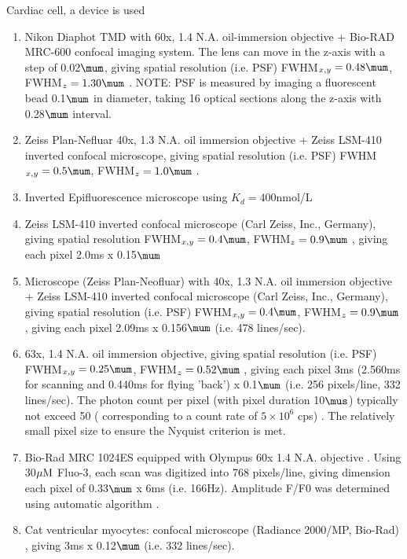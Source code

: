 Cardiac cell, a device is used
\begin{enumerate}
  \item Nikon Diaphot TMD with 60x, 1.4 N.A. oil-immersion objective + Bio-RAD
  MRC-600 confocal imaging system. The lens can move in the z-axis with a step
  of 0.02$\mum$, giving spatial resolution (i.e. PSF) FWHM$_{x,y}=0.48\mum$,
  FWHM$_z=1.30\mum$ \citep{pratusevich1996}. NOTE: PSF is measured by imaging a
  fluorescent bead 0.1$\mum$ in diameter, taking 16 optical sections along the
  z-axis with 0.28$\mum$ interval.
  
  \item Zeiss Plan-Nefluar 40x, 1.3 N.A. oil immersion objective + Zeiss LSM-410
  inverted confocal microscope, giving spatial resolution (i.e. PSF)
  FWHM$_{x,y}=0.5\mum$, FWHM$_z=1.0\mum$ \citep{song1997}.
  
  \item Inverted Epifluorescence microscope using $K_d=400$nmol/L
  \citep{trafford1997, dibb2004, walden2009}
 
  \item Zeiss LSM-410 inverted confocal microscope (Carl Zeiss, Inc., Germany),
  giving spatial resolution FWHM$_{x,y}=0.4\mum$,
  FWHM$_z=0.9\mum$ \citep{smith1998}, giving each pixel 2.0ms x 0.15$\mum$
  
  \item Microscope (Zeiss Plan-Neofluar) with 40x, 1.3 N.A. oil
  immersion objective + Zeiss LSM-410 inverted confocal microscope (Carl Zeiss,
  Inc., Germany), giving spatial resolution (i.e. PSF) FWHM$_{x,y}=0.4\mum$,
  FWHM$_z=0.9\mum$ \citep{cheng1999}, giving each pixel 2.09ms x 0.156$\mum$
  (i.e. 478 lines/sec).
  
  \item 63x, 1.4 N.A. oil immersion objective, giving spatial resolution (i.e.
  PSF) FWHM$_{x,y}=0.25\mum$, FWHM$_z=0.52\mum$ \citep{wier2000, izu2001lcg},
  giving each pixel 3ms (2.560ms for scanning and 0.440ms for flying 'back') x
  0.1$\mum$ (i.e. 256 pixels/line, 332 lines/sec). The photon count per pixel
  (with pixel duration 10$\mus$) typically not exceed 50 ( corresponding to a
  count rate of $5\times 10^6$ cps) \citep{izu2001}. The relatively small pixel
  size to ensure the Nyquist criterion is met. 
  
  \item Bio-Rad MRC 1024ES equipped with Olympus 60x 1.4 N.A. objective
  \citep{lukyanenko1999, lukyanenko2000, lukyanenko2001}. Using 30${\mu\text{M}}$ Fluo-3,
  each scan was digitized into 768 pixels/line, giving dimension each pixel of
  0.33$\mum$ x 6ms (i.e.
  166Hz). Amplitude F/F0 was determined using automatic algorithm
  \citep{song1997,cheng1999, lukyanenko2000}.

  \item Cat ventricular myocytes: confocal microscope (Radiance 2000/MP,
  Bio-Rad) \citep{picht2007}, giving 3ms x 0.12$\mum$ (i.e. 332 lines/sec). 
  
\end{enumerate}

